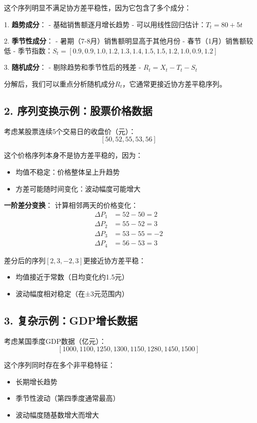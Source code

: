 这个序列明显不满足协方差平稳性，因为它包含了多个成分：

1. \textbf{趋势成分}：
   - 基础销售额逐月增长趋势
   - 可以用线性回归估计：$T_t = 80 + 5t$

2. \textbf{季节性成分}：
   - 暑期（7-8月）销售额明显高于其他月份
   - 春节（1月）销售额较低
   - 季节指数：$S_t = [0.9, 0.9, 1.0, 1.2, 1.3, 1.4, 1.5, 1.5, 1.2, 1.0, 0.9, 1.2]$

3. \textbf{随机成分}：
   - 剔除趋势和季节性后的残差
   - $R_t = X_t - T_t - S_t$

分解后，我们可以重点分析随机成分$R_t$，它通常更接近协方差平稳序列。

\subsection{2. 序列变换示例：股票价格数据}
考虑某股票连续5个交易日的收盘价（元）：
$$[50, 52, 55, 53, 56]$$

这个价格序列本身不是协方差平稳的，因为：
\begin{itemize}
    \item 均值不稳定：价格整体呈上升趋势
    \item 方差可能随时间变化：波动幅度可能增大
\end{itemize}

\textbf{一阶差分变换}：
计算相邻两天的价格变化：
\begin{align*}
    \Delta P_1 &= 52 - 50 = 2 \\
    \Delta P_2 &= 55 - 52 = 3 \\
    \Delta P_3 &= 53 - 55 = -2 \\
    \Delta P_4 &= 56 - 53 = 3
\end{align*}

差分后的序列$[2, 3, -2, 3]$更接近协方差平稳：
\begin{itemize}
    \item 均值接近于常数（日均变化约1.5元）
    \item 波动幅度相对稳定（在±3元范围内）
\end{itemize}

\subsection{3. 复杂示例：GDP增长数据}
考虑某国季度GDP数据（亿元）：
$$[1000, 1100, 1250, 1300, 1150, 1280, 1450, 1500]$$

这个序列同时存在多个非平稳特征：
\begin{itemize}
    \item 长期增长趋势
    \item 季节性波动（第四季度通常最高）
    \item 波动幅度随基数增大而增大
\end{itemize}

